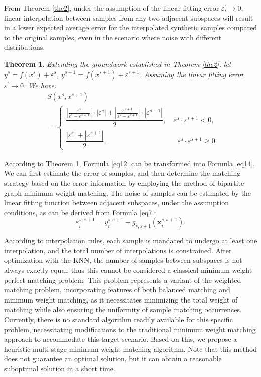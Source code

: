 \documentclass[lettersize,journal]{IEEEtran}
\newtheorem{theorem}{Theorem}
\begin{document}
From Theorem \ref{the2}, under the assumption of the linear fitting error 
$\varepsilon_i^\prime\rightarrow0$, linear interpolation between 
samples from any two adjacent subspaces will result in a lower expected 
average error for the interpolated synthetic samples compared to 
the original samples, even in the scenario where noise with different 
distributions. 

\begin{theorem}
\label{the3}
Extending the groundwork established in Theorem \ref{the2}, let 
$y^s=f(x^s)+\varepsilon^s$, $y^{s+1}=f(x^{s+1})+\varepsilon^{s+1}$.
 Assuming the linear fitting error $\varepsilon^\prime
 \rightarrow0$. We have: 
\begin{equation}
\label{eq14}
\begin{aligned}
&\bar{S}(x^s,x^{s+1})\\
&=
\begin{cases} 
\dfrac{|\frac{\varepsilon^s}{\varepsilon^s-\varepsilon^{s+1}}|
\cdot |\varepsilon^{s}|+|\frac{\varepsilon^{s+1}}{\varepsilon^s-
\varepsilon^{s+1}}|\cdot|\varepsilon^{s+1}|}{2},\quad\varepsilon^s
\cdot \varepsilon^{s+1}<0,
\\
\dfrac{|\varepsilon^s|+|\varepsilon^{s+1}|}{2}, 
\qquad\qquad\qquad\qquad\qquad\varepsilon^s\cdot 
\varepsilon^{s+1}\ge0.
\end{cases}
\end{aligned}
\end{equation}
\end{theorem}

According to Theorem \ref{the3}, Formula \eqref{eq12} can be transformed into 
Formula \eqref{eq14}. We can first estimate the error of samples, 
and then determine the matching strategy based on the error 
information by employing the method of bipartite graph minimum 
weight matching. The noise of samples can be estimated by the 
linear fitting function between adjacent subspaces, under the 
assumption conditions, as can be derived from Formula \eqref{eq7}:
\begin{equation} 
\label{eq15}
\varepsilon_i^{s,s+1}=y_i^{s,s+1}-g_{s,s+1}(\boldsymbol{x}_i^
{s,s+1}).
\end{equation} 

According to interpolation rules, each sample is mandated to 
undergo at least one interpolation, and the total number of 
interpolations is constrained. After optimization with the KNN, 
the number of samples between subspaces is not always exactly 
equal, thus this cannot be considered a classical minimum weight perfect 
matching problem. This problem represents a variant of the 
weighted matching problem, incorporating features of both 
balanced matching and minimum weight matching, as it necessitates 
minimizing the total weight of matching while also ensuring the 
uniformity of sample matching occurrences. Currently, there is 
no standard algorithm readily available for this specific 
problem, necessitating modifications to the traditional minimum 
weight matching approach to accommodate this target scenario. 
Based on this, we propose a heuristic multi-stage minimum weight 
matching algorithm. Note that this method does not guarantee an 
optimal solution, but it can obtain a reasonable suboptimal 
solution in a short time.
\end{document}
